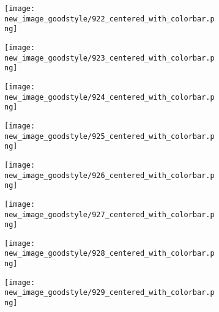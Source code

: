 \documentclass[a4paper,12pt]{article}
\begin{document}
\begin{figure}[H]
  \begin{subfigure}{0.11\textwidth}
    \texttt{[image: new\_image\_goodstyle/922\_centered\_with\_colorbar.png]}
  \end{subfigure}
  \hfill
  \begin{subfigure}{0.11\textwidth}
    \texttt{[image: new\_image\_goodstyle/923\_centered\_with\_colorbar.png]}
  \end{subfigure}
  \hfill
  \begin{subfigure}{0.11\textwidth}
    \texttt{[image: new\_image\_goodstyle/924\_centered\_with\_colorbar.png]}
  \end{subfigure}
  \hfill
  \begin{subfigure}{0.11\textwidth}
    \texttt{[image: new\_image\_goodstyle/925\_centered\_with\_colorbar.png]}
  \end{subfigure}
  \hfill
  \begin{subfigure}{0.11\textwidth}
    \texttt{[image: new\_image\_goodstyle/926\_centered\_with\_colorbar.png]}
  \end{subfigure}
  \hfill
  \begin{subfigure}{0.11\textwidth}
    \texttt{[image: new\_image\_goodstyle/927\_centered\_with\_colorbar.png]}
  \end{subfigure}
  \hfill
  \begin{subfigure}{0.11\textwidth}
    \texttt{[image: new\_image\_goodstyle/928\_centered\_with\_colorbar.png]}
  \end{subfigure}
  \hfill
  \begin{subfigure}{0.11\textwidth}
    \texttt{[image: new\_image\_goodstyle/929\_centered\_with\_colorbar.png]}
  \end{subfigure}
  \hfill
\end{figure}
\end{document}
